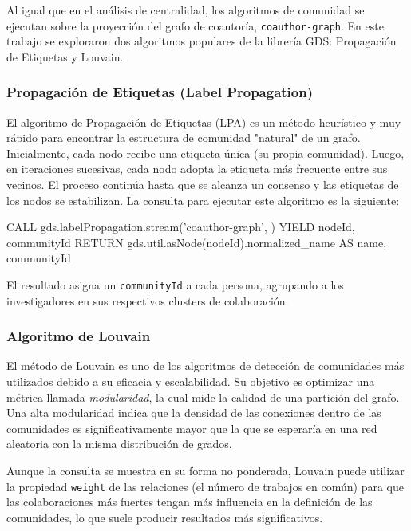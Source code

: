 \documentclass[journal]{IEEEtran}
\begin{document}
Al igual que en el análisis de centralidad, los algoritmos de comunidad se ejecutan sobre la proyección del grafo de coautoría, \texttt{coauthor-graph}. En este trabajo se exploraron dos algoritmos populares de la librería GDS: Propagación de Etiquetas y Louvain.

\subsubsection{Propagación de Etiquetas (Label Propagation)}
El algoritmo de Propagación de Etiquetas (LPA) es un método heurístico y muy rápido para encontrar la estructura de comunidad "natural" de un grafo. Inicialmente, cada nodo recibe una etiqueta única (su propia comunidad). Luego, en iteraciones sucesivas, cada nodo adopta la etiqueta más frecuente entre sus vecinos. El proceso continúa hasta que se alcanza un consenso y las etiquetas de los nodos se estabilizan. La consulta para ejecutar este algoritmo es la siguiente:

\begin{sflisting}[style=sparql,caption= Detección de comunidades con Propagación de Etiquetas,label=codigo_lpa]
	CALL gds.labelPropagation.stream('coauthor-graph', {})
	YIELD nodeId, communityId
	RETURN gds.util.asNode(nodeId).normalized_name AS name, communityId
\end{sflisting}

El resultado asigna un \texttt{communityId} a cada persona, agrupando a los investigadores en sus respectivos clusters de colaboración.

\subsubsection{Algoritmo de Louvain}
El método de Louvain es uno de los algoritmos de detección de comunidades más utilizados debido a su eficacia y escalabilidad. Su objetivo es optimizar una métrica llamada \textit{modularidad}, la cual mide la calidad de una partición del grafo. Una alta modularidad indica que la densidad de las conexiones dentro de las comunidades es significativamente mayor que la que se esperaría en una red aleatoria con la misma distribución de grados.

Aunque la consulta se muestra en su forma no ponderada, Louvain puede utilizar la propiedad \texttt{weight} de las relaciones (el número de trabajos en común) para que las colaboraciones más fuertes tengan más influencia en la definición de las comunidades, lo que suele producir resultados más significativos.
\end{document}
